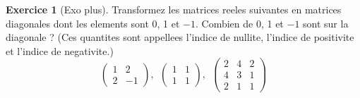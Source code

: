\documentclass[a4paper,12pt,french]{report}
\theoremstyle{plain}
\theoremstyle{definition}
\newtheorem{exercise}{Exercice}[chapter]
\begin{document}
\begin{exercise}[Exo plus]
Transformez les matrices reeles suivantes en matrices diagonales dont les elements sont 0, 1 et $-1$. Combien de 0, 1 et $-1$ sont sur la diagonale ? (Ces quantites sont appellees l'indice de nullite, l'indice de positivite et l'indice de negativite.)
$$
\begin{pmatrix}
1 & 2 \\
2 & -1 
\end{pmatrix},~~\begin{pmatrix}
1 & 1 \\
1 & 1
\end{pmatrix},~~\begin{pmatrix}
2 & 4 & 2 \\
4 & 3 & 1 \\
2 & 1 & 1
\end{pmatrix}
$$
\end{exercise}
\end{document}
